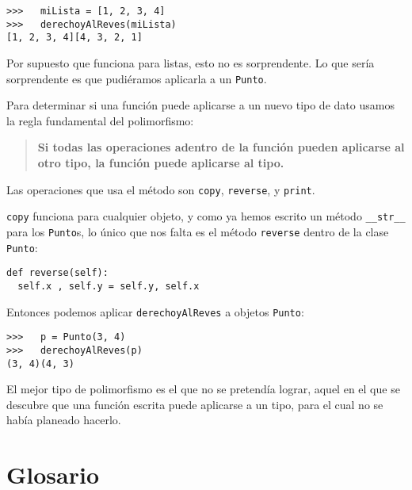 \beforeverb
\begin{verbatim}
>>>   miLista = [1, 2, 3, 4]
>>>   derechoyAlReves(miLista)
[1, 2, 3, 4][4, 3, 2, 1]
\end{verbatim}
\afterverb
%
Por supuesto que funciona para listas, esto no es sorprendente.
Lo que sería sorprendente es que pudiéramos aplicarla a
 un  \texttt{Punto}.

Para determinar si una función puede aplicarse a un nuevo
tipo de dato usamos la regla fundamental del polimorfismo:

\begin{quote}
{\bf Si todas las operaciones adentro de la función pueden 
aplicarse al otro tipo, la función puede aplicarse al tipo.}
\end{quote}

Las operaciones que usa el método son  \texttt{copy}, \texttt{reverse}, y
\texttt{print}.

\texttt{copy} funciona para cualquier objeto, y como ya hemos escrito
un método \texttt{\_\_str\_\_} para los \texttt{Punto}s, lo único que
nos falta es el método  \texttt{reverse} dentro de la clase \texttt{Punto}:

\beforeverb
\begin{verbatim}
def reverse(self):
  self.x , self.y = self.y, self.x
\end{verbatim}
\afterverb
%
Entonces podemos aplicar \texttt{derechoyAlReves} a objetos \texttt{Punto}:


\beforeverb
\begin{verbatim}
>>>   p = Punto(3, 4)
>>>   derechoyAlReves(p)
(3, 4)(4, 3)
\end{verbatim}
\afterverb
%
El mejor tipo de polimorfismo es el que no se pretendía lograr, aquel
en el que se descubre que una función escrita puede aplicarse a un 
tipo, para el cual no se había planeado hacerlo.



\section{Glosario}

